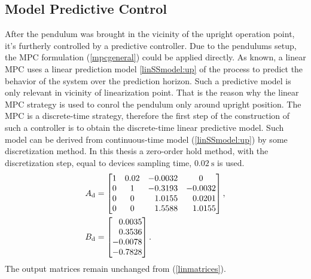 \subsection{Model Predictive Control}
After the pendulum was brought in the vicinity of the upright operation point, it's furtherly controlled by a predictive controller. Due to the pendulums setup, the MPC formulation (\ref{mpcgeneral}) could be applied directly. As known, a linear MPC uses a linear prediction model \ref{linSSmodel:up} of the process to predict the behavior of the system over the prediction horizon. Such a predictive model is only relevant in vicinity of linearization point. That is the reason why the linear MPC strategy is used to conrol the pendulum only around upright position. 
The MPC is a discrete-time strategy, therefore the first step of the construction of such a controller is to obtain the discrete-time linear predictive model. Such model can be derived from continuous-time model (\ref{linSSmodel:up}) by some discretization method. In this thesis a zero-order hold method, with the discretization step, equal to devices sampling time, $\SI{0.02}{\second}$ is used. 
\begin{subequations}\label{dismatrices}
	\begin{align}
	A _{\text{d}} &=\begin{bmatrix}
	1&0.02&-0.0032& 0\\
	0&1&-0.3193&-0.0032\\
	0&0&\ \; \,1.0155&\ \; \,0.0201\\
	0&0&\ \; \,1.5588&\ \; \,1.0155
	\end{bmatrix},\\
	B _{\text{d}} &=\begin{bmatrix}
	\ \; \,0.0035\\
	\ \; \,0.3536\\
	-0.0078\\
	-0.7828
	\end{bmatrix}.\\
	\end{align}
\end{subequations}
The output matrices remain unchanged from (\ref{linmatrices}).\\ 

